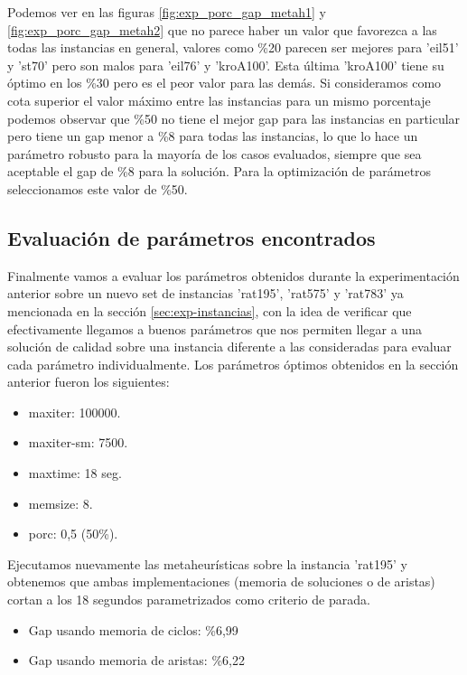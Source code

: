 \documentclass[10pt,a4paper]{article}
\begin{document}
Podemos ver en las figuras \ref{fig:exp_porc_gap_metah1} y \ref{fig:exp_porc_gap_metah2} que no parece haber un valor que favorezca a las todas las instancias en general, valores como \%20 parecen ser mejores para 'eil51' y 'st70' pero son malos para 'eil76' y 'kroA100'. Esta última 'kroA100' tiene su óptimo en los \%30 pero es el peor valor para las demás. Si consideramos como cota superior el valor máximo entre las instancias para un mismo porcentaje podemos observar que \%50 no tiene el mejor gap para las instancias en particular pero tiene un gap menor a \%8 para todas las instancias, lo que lo hace un parámetro robusto para la mayoría de los casos evaluados, siempre que sea aceptable el gap de \%8 para la solución. Para la optimización de parámetros seleccionamos este valor de \%50.

\subsection{Evaluación de parámetros encontrados}
Finalmente vamos a evaluar los parámetros obtenidos durante la experimentación anterior sobre un nuevo set de instancias 'rat195', 'rat575' y 'rat783' ya mencionada en la sección \ref{sec:exp-instancias}, con la idea de verificar que efectivamente llegamos a buenos parámetros que nos permiten llegar a una solución de calidad sobre una instancia diferente a las consideradas para evaluar cada parámetro individualmente.
Los parámetros óptimos obtenidos en la sección anterior fueron los siguientes:
\begin{itemize}
    \setlength\itemsep{-0.4em}
    \item maxiter: 100000.
    \item maxiter-sm: 7500.
    \item maxtime: 18 seg.
    \item memsize: 8.
    \item porc: 0,5 (50\%).
\end{itemize}

Ejecutamos nuevamente las metaheurísticas sobre la instancia 'rat195' y obtenemos que ambas implementaciones (memoria de soluciones o de aristas) cortan a los 18 segundos parametrizados como criterio de parada.
\begin{itemize}
    \item Gap usando memoria de ciclos: \%6,99
    \item Gap usando memoria de aristas: \%6,22
\end{itemize}
\end{document}

